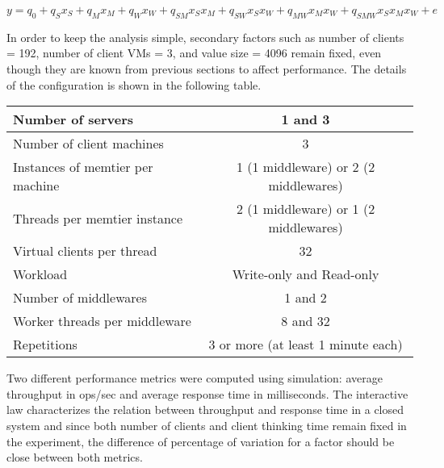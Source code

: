 \documentclass[report.tex]{subfiles}
\begin{document}
\begin{equation}
y=q_0 + q_Sx_S + q_Mx_M + q_Wx_W + q_{SM}x_Sx_M + q_{SW}x_Sx_W + q_{MW}x_Mx_W + q_{SMW}x_Sx_Mx_W + e
\label{exp60_2k_additive_model}
\end{equation}

In order to keep the analysis simple, secondary factors such as number of clients = 192, number of client VMs = 3, and value size = 4096 remain fixed, even though they are known from previous sections to affect performance.
The details of the configuration is shown in the following table.

\begin{center}
	\scriptsize{
		\begin{tabular}{|l|c|}
			\hline Number of servers                & 1 and 3                                     \\ 
			\hline Number of client machines        & 3                                           \\ 
			\hline Instances of memtier per machine & 1 (1 middleware) or 2 (2 middlewares) \\ 
			\hline Threads per memtier instance     & 2 (1 middleware) or 1 (2 middlewares)   \\
			\hline Virtual clients per thread       &  32                                     \\ 
			\hline Workload                         & Write-only and Read-only\\
			\hline Number of middlewares            & 1 and 2                                     \\
			\hline Worker threads per middleware    & 8 and 32                                    \\
			\hline Repetitions                      & 3 or more (at least 1 minute each)                                   \\ 
			\hline 
		\end{tabular}
	} 
\end{center}


Two different performance metrics were computed using simulation: average throughput in ops/sec and average response time in milliseconds. The interactive law characterizes the relation between throughput and response time in a closed system and since both number of clients and client thinking time remain fixed in the experiment, the difference of percentage of variation for a factor should be close between both metrics.
\end{document}

